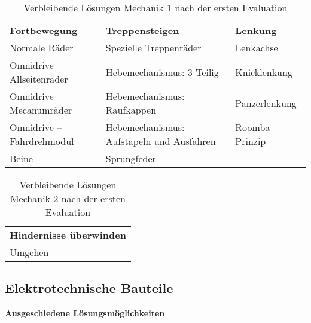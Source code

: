 \begin{center}
\begin{table}[h!]
    \begin{tabular}{l|l|l}
        \textbf{Fortbewegung} & \textbf{Treppensteigen} & \textbf{Lenkung}\\
        Normale Räder & Spezielle Treppenräder & Lenkachse\\ 
        Omnidrive – Allseitenräder & Hebemechanismus: 3-Teilig & Knicklenkung\\ 
        Omnidrive – Mecanumräder & Hebemechanismus: Raufkappen & Panzerlenkung\\ 
        Omnidrive – Fahrdrehmodul & Hebemechanismus: Aufstapeln und Ausfahren & Roomba - Prinzip\\ 
        Beine & Sprungfeder &\\
    \end{tabular}
    \caption{Verbleibende Lösungen Mechanik 1 nach der ersten Evaluation}
\end{table}
\end{center}

\begin{center}
\begin{table}[h!]
    \begin{tabular}{l}
        \textbf{Hindernisse überwinden}\\
        Umgehen
    \end{tabular}
    \caption{Verbleibende Lösungen Mechanik 2 nach der ersten Evaluation}
\end{table}
\end{center}
\newpage


\subsection{Elektrotechnische Bauteile}

\textbf{Ausgeschiedene Lösungsmöglichkeiten}

